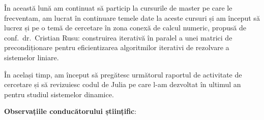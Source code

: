 
\makereportpreamble

În această lună am continuat să particip la cursurile de master pe care le frecventam, am lucrat în continuare temele date la aceste cursuri și am început să lucrez și pe o temă de cercetare în zona conexă de calcul numeric, propusă de conf.~dr.~Cristian Rusu: construirea iterativă în paralel a unei matrici de precondiționare pentru eficientizarea algoritmilor iterativi de rezolvare a sistemelor liniare.

În același timp, am început să pregătesc următorul raportul de activitate de cercetare și să revizuiesc codul de Julia pe care l-am dezvoltat în ultimul an pentru studiul sistemelor dinamice.

\vspace{0.5em}

\textbf{Observațiile conducătorului științific}:

\vspace{3em}

